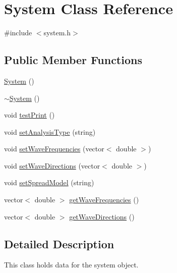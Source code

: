 \hypertarget{class_system}{\section{System Class Reference}
\label{class_system}
}


{\ttfamily \#include $<$system.\-h$>$}

\subsection*{Public Member Functions}
\begin{DoxyCompactItemize}
\item 
\hyperlink{class_system_ae317936c9bcf1374d61745572e0f2f8a}{System} ()
\item 
\hyperlink{class_system_a3be70bb338e3f062f821173fd15680d0}{$\sim$\-System} ()
\item 
void \hyperlink{class_system_a20bda2428f8aef211bf8787e1efeeeee}{test\-Print} ()
\item 
void \hyperlink{class_system_ae58c969c9ba0a1ec4bebff64b88a22ed}{set\-Analysis\-Type} (string)
\item 
void \hyperlink{class_system_ab1bfe916791d4c61bb807c930f73930c}{set\-Wave\-Frequencies} (vector$<$ double $>$)
\item 
void \hyperlink{class_system_a492b1dc5f789192ff6207f2555b23138}{set\-Wave\-Directions} (vector$<$ double $>$)
\item 
void \hyperlink{class_system_a2c26340bdbd94e6bed0f75dba991b49c}{set\-Spread\-Model} (string)
\item 
vector$<$ double $>$ \hyperlink{class_system_a18b18022b6468a41dfdbfc49c881b933}{get\-Wave\-Frequencies} ()
\item 
vector$<$ double $>$ \hyperlink{class_system_a8e1d633a4b604223236e4cc4de35bd70}{get\-Wave\-Directions} ()
\end{DoxyCompactItemize}


\subsection{Detailed Description}
This class holds data for the system object. 

